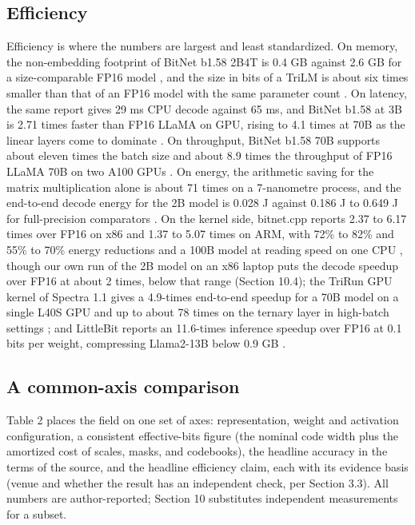 \documentclass[11pt]{article}
\begin{document}
\subsection{Efficiency}

Efficiency is where the numbers are largest and least standardized. On memory, the
non-embedding footprint of BitNet b1.58 2B4T is 0.4 GB against 2.6 GB for a
size-comparable FP16 model \cite{Ma2025-BitNet2B4T}, and the size in bits of a TriLM is about
six times smaller than that of an FP16 model with the same parameter count
\cite{Kaushal2024-Spectra}. On latency, the same report gives 29 ms CPU decode against 65 ms,
and BitNet b1.58 at 3B is 2.71 times faster than FP16 LLaMA on GPU, rising to 4.1 times
at 70B as the linear layers come to dominate \cite{Ma2024-BitNetB158}. On throughput, BitNet
b1.58 70B supports about eleven times the batch size and about 8.9 times the throughput
of FP16 LLaMA 70B on two A100 GPUs \cite{Ma2024-BitNetB158}. On energy, the arithmetic saving
for the matrix multiplication alone is about 71 times on a 7-nanometre process, and the
end-to-end decode energy for the 2B model is 0.028 J against 0.186 J to 0.649 J for
full-precision comparators \cite{Ma2024-BitNetB158,Ma2025-BitNet2B4T}. On the kernel side,
bitnet.cpp reports 2.37 to 6.17 times over FP16 on x86 and 1.37 to 5.07 times on ARM,
with 72\% to 82\% and 55\% to 70\% energy reductions and a 100B model at reading speed
on one CPU \cite{Wang2024-1bitAIInfra,Wang2025-BitNetCPP}, though our own run of the 2B
model on an x86 laptop puts the decode speedup over FP16 at about 2 times, below that
range (Section 10.4); the TriRun GPU kernel of
Spectra 1.1 gives a 4.9-times end-to-end speedup for a 70B model on a single L40S GPU
and up to about 78 times on the ternary layer in high-batch settings
\cite{Vaidhya2025-Spectra11}; and LittleBit reports an 11.6-times inference speedup over FP16
at 0.1 bits per weight, compressing Llama2-13B below 0.9 GB \cite{Lee2025-LittleBit}.

\subsection{A common-axis comparison}

Table 2 places the field on one set of axes: representation, weight and activation
configuration, a consistent effective-bits figure (the nominal code width plus the
amortized cost of scales, masks, and codebooks), the headline accuracy in the terms of
the source, and the headline efficiency claim, each with its evidence basis (venue and
whether the result has an independent check, per Section 3.3). All numbers
are author-reported; Section 10 substitutes independent measurements for a subset.
\end{document}
